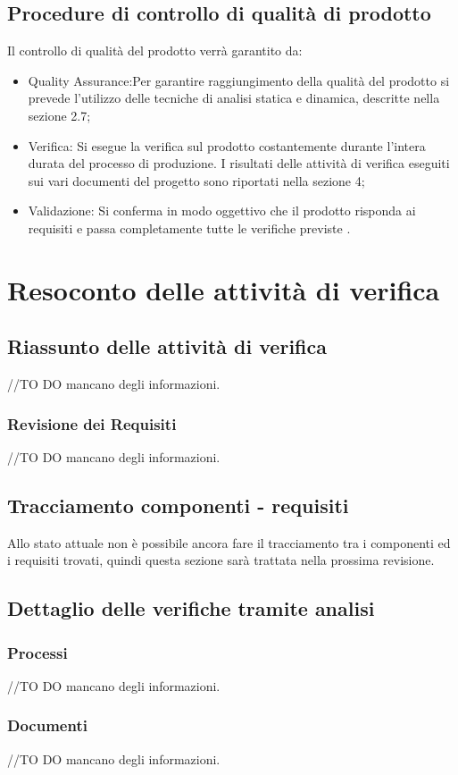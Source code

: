 \documentclass[12pt,a4paper]{article}
\begin{document}
\subsection{Procedure di controllo di qualità di prodotto}
Il controllo di qualità del prodotto verrà garantito da:
\begin{itemize}
\item Quality Assurance:Per garantire raggiungimento della qualità del prodotto  si  prevede l'utilizzo delle tecniche di analisi statica e dinamica, descritte nella sezione 2.7;
\item Verifica: Si esegue la verifica sul prodotto costantemente durante l'intera durata del processo di produzione. I risultati delle attività di verifica eseguiti sui vari documenti del progetto sono riportati nella sezione 4;
\item Validazione: Si conferma in modo oggettivo che il prodotto risponda ai requisiti e passa completamente tutte le verifiche previste .
\end{itemize}
\newpage
\section{ Resoconto delle attività di verifica}
\subsection{Riassunto delle attività di verifica}
//TO DO \IB mancano degli informazioni.
\subsubsection{Revisione dei Requisiti}
//TO DO \IB mancano degli informazioni.
\subsection{Tracciamento componenti - requisiti}
Allo stato attuale non è possibile ancora fare il tracciamento tra i componenti ed i requisiti trovati, quindi questa sezione sarà trattata nella prossima revisione.
\subsection{Dettaglio delle verifiche tramite analisi}
\subsubsection{Processi}
//TO DO \IB mancano degli informazioni.
\subsubsection{Documenti}
//TO DO \IB mancano degli informazioni.
\end{document}

